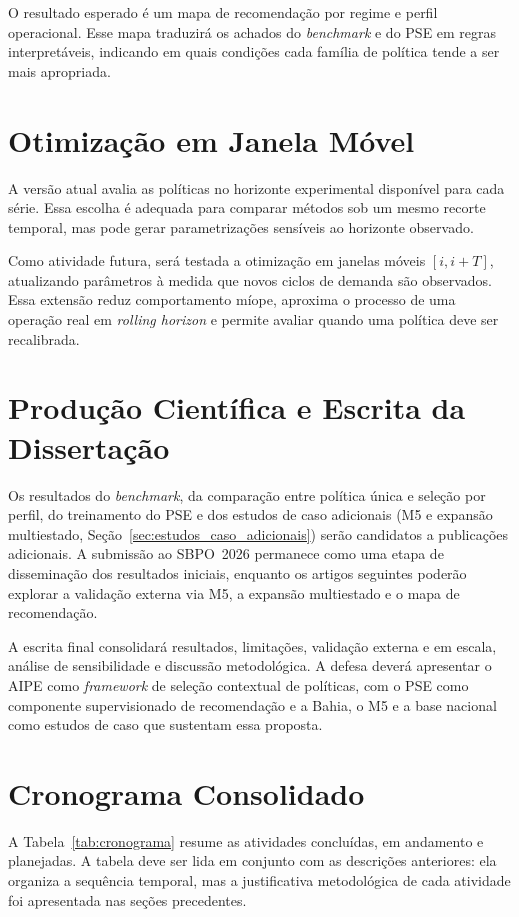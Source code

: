 O resultado esperado é um mapa de recomendação por regime e perfil operacional. Esse mapa traduzirá os achados do \textit{benchmark} e do PSE em regras interpretáveis, indicando em quais condições cada família de política tende a ser mais apropriada.

\section{Otimização em Janela Móvel}

A versão atual avalia as políticas no horizonte experimental disponível para cada série. Essa escolha é adequada para comparar métodos sob um mesmo recorte temporal, mas pode gerar parametrizações sensíveis ao horizonte observado.

Como atividade futura, será testada a otimização em janelas móveis $[i,i+T]$, atualizando parâmetros à medida que novos ciclos de demanda são observados. Essa extensão reduz comportamento míope, aproxima o processo de uma operação real em \textit{rolling horizon} e permite avaliar quando uma política deve ser recalibrada.

\section{Produção Científica e Escrita da Dissertação}

Os resultados do \textit{benchmark}, da comparação entre política única e seleção por perfil, do treinamento do PSE e dos estudos de caso adicionais (M5 e expansão multiestado, Seção~\ref{sec:estudos_caso_adicionais}) serão candidatos a publicações adicionais. A submissão ao SBPO~2026 permanece como uma etapa de disseminação dos resultados iniciais, enquanto os artigos seguintes poderão explorar a validação externa via M5, a expansão multiestado e o mapa de recomendação.

A escrita final consolidará resultados, limitações, validação externa e em escala, análise de sensibilidade e discussão metodológica. A defesa deverá apresentar o AIPE como \textit{framework} de seleção contextual de políticas, com o PSE como componente supervisionado de recomendação e a Bahia, o M5 e a base nacional como estudos de caso que sustentam essa proposta.

\section{Cronograma Consolidado}

A Tabela~\ref{tab:cronograma} resume as atividades concluídas, em andamento e planejadas. A tabela deve ser lida em conjunto com as descrições anteriores: ela organiza a sequência temporal, mas a justificativa metodológica de cada atividade foi apresentada nas seções precedentes.

